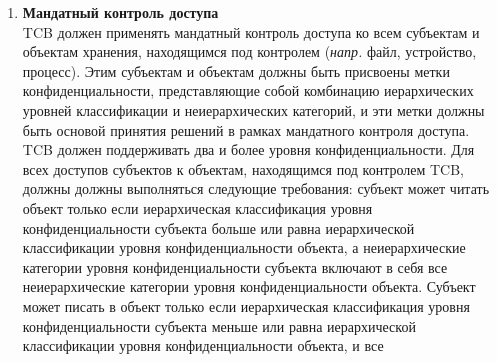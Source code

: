 \begin{enumerate}
\begin{enumerate}
\begin{enumerate}
\begin{enumerate}
                конфиденциальности данных, и все такие действия должны заноситься в журнал аудита.
                \begin{itemize}
                    \item{\textbf{Целостность меток}}\\
                    Метки конфиденциальности должны точно отражать уровень конфиденциальности конкретных субъектов и объектов, с которыми они ассоциированы. При экспорте из TCB метки конфиденциальности
                    должны однозначно соответствовать внутренним меткам и быть ассоциированы с экспортируемой информацией.
                    \item{\textbf{Экспорт маркированной информации}}\\
                    TCB должен классифицировать каждый канал связи и устройство ввода/вывода как одноуровневый или многоуровневый (\textit{прим. } передается ли метка конфиденциальности вместе с данными
                    или нет). Любое изменение этой классификации должно производиться вручную и проверяться TCB. TCB должен поддерживать и иметь возможность проверять любые изменения в уровне
                    конфиденциальности или классификации, связанной с каналом связи или устройством ввода/вывода.
                \end{itemize}
                \item{\textbf{Мандатный контроль доступа}}\\
                TCB должен применять мандатный контроль доступа ко всем субъектам и объектам хранения, находящимся под контролем (\textit{напр. } файл, устройство, процесс). Этим субъектам и объектам
                должны быть присвоены метки конфиденциальности, представляющие собой комбинацию иерархических уровней классификации и неиерархических категорий, и эти метки должны быть основой принятия
                решений в рамках мандатного контроля доступа. TCB должен поддерживать два и более уровня конфиденциальности. Для всех доступов субъектов к объектам, находящимся под контролем  TCB, должны
                должны выполняться следующие требования: субъект может читать объект только если иерархическая классификация уровня конфиденциальности субъекта больше или равна иерархической классификации
                уровня конфиденциальности объекта, а неиерархические категории уровня конфиденциальности субъекта включают в себя все неиерархические категории уровня конфиденциальности объекта. Субъект может
                писать в объект только если иерархическая классификация уровня конфиденциальности субъекта меньше или равна иерархической классификации уровня конфиденциальности объекта, и все

\end{enumerate}
\end{enumerate}
\end{enumerate}
\end{enumerate}
